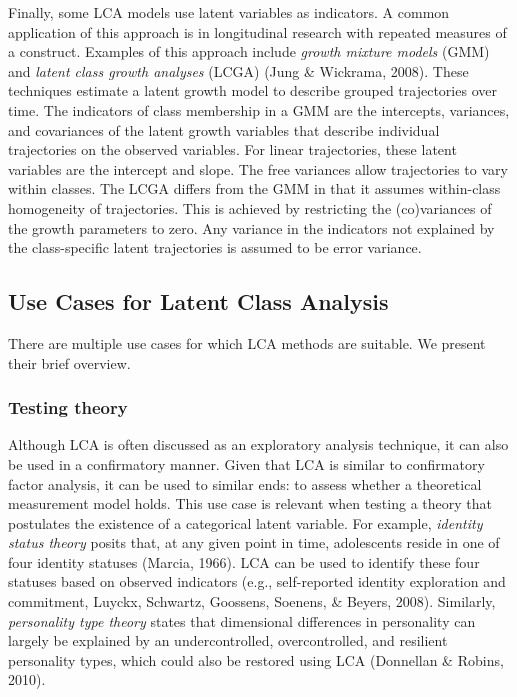 \documentclass[
  ,man,floatsintext]{apa6}
\begin{document}
Finally, some LCA models use latent variables as indicators.
A common application of this approach is in
longitudinal research with repeated measures of a construct.
Examples of this approach include
\emph{growth mixture models} (GMM) and \emph{latent class growth analyses} (LCGA)
(Jung \& Wickrama, 2008).
These techniques estimate a latent growth model
to describe grouped trajectories over time.
The indicators of class membership in a GMM are the
intercepts, variances, and covariances of the latent growth variables that describe individual trajectories on the observed variables.
For linear trajectories, these latent variables are the intercept and slope.
The free variances allow trajectories to vary within classes. The LCGA differs from the GMM in that it assumes within-class homogeneity of trajectories.
This is achieved by restricting the (co)variances of the growth parameters to zero.
Any variance in the indicators not explained by the class-specific
latent trajectories is assumed to be error variance.

\hypertarget{use-cases-for-latent-class-analysis}{%
\subsection{Use Cases for Latent Class Analysis}\label{use-cases-for-latent-class-analysis}}

There are multiple use cases for which LCA methods are suitable. We present their brief overview.

\hypertarget{testing-theory}{%
\subsubsection{Testing theory}\label{testing-theory}}

Although LCA is often discussed as an exploratory analysis technique,
it can also be used in a confirmatory manner.
Given that LCA is similar to confirmatory factor analysis,
it can be used to similar ends:
to assess whether a theoretical measurement model holds.
This use case is relevant when testing a theory that postulates the existence of a categorical latent variable.
For example, \emph{identity status theory} posits that, at any given point in time, adolescents reside in one of four identity statuses (Marcia, 1966).
LCA can be used to identify these four statuses based on observed indicators (e.g., self-reported identity exploration and commitment, Luyckx, Schwartz, Goossens, Soenens, \& Beyers, 2008).
Similarly, \emph{personality type theory} states that dimensional differences in personality can largely be explained by an undercontrolled, overcontrolled, and resilient personality types, which could also be restored using LCA (Donnellan \& Robins, 2010).
\end{document}

